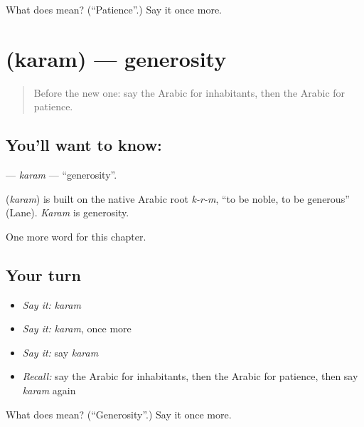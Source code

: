 \begin{tcolorbox}[breakable,colback=teal!4,colframe=teal!35!black,title={Before you move on}]
What does  mean? (\textquotedblleft{}Patience\textquotedblright{}.) Say it once more.
\end{tcolorbox}
\section[\texorpdfstring{\ar{كرم} (karam)}{كرم (karam)}]{ (karam) — generosity}

\label{lesson:AR-C237-karam}



\begin{quote}
Before the new one: say the Arabic for inhabitants, then the Arabic for patience.
\end{quote}

\subsection*{You'll want to know: }
\textbf{} — \emph{karam} — \textquotedblleft{}generosity\textquotedblright{}.

\begin{cousinweb}
\textbf{} (\emph{karam}) is built on the native Arabic root \emph{k-r-m}, \textquotedblleft{}to be noble, to be generous\textquotedblright{} (Lane). \emph{Karam} is generosity.
\end{cousinweb}

\begin{grammarlens}[title={What you've built}]
One more word for this chapter.
\end{grammarlens}

\subsection*{Your turn}
\begin{itemize}
\raggedright
  \item \emph{Say it:} \emph{karam}
  \item \emph{Say it:} \emph{karam}, once more
  \item \emph{Say it:} say \emph{karam}
  \item \emph{Recall:} say the Arabic for inhabitants, then the Arabic for patience, then say \emph{karam} again
\end{itemize}

\begin{tcolorbox}[breakable,colback=teal!4,colframe=teal!35!black,title={Before you move on}]
What does  mean? (\textquotedblleft{}Generosity\textquotedblright{}.) Say it once more.
\end{tcolorbox}
